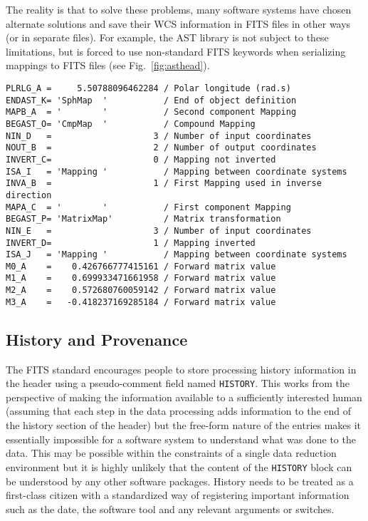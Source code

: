 \documentclass[final,authoryear,5p,times,twocolumn]{elsarticle}
\begin{document}
{{The reality is that to solve these problems, many software systems
have chosen alternate solutions and save their WCS information in FITS
files in other ways (or in separate files). For example, the AST
library \citep{1998ASPC..145...41W,2012ASPC..461..825B} is not subject
to these limitations, but
is forced to use non-standard FITS keywords when serializing mappings
to FITS files (see Fig.~\ref{fig:asthead}).


\begin{figure*}
\begin{minipage}{\textwidth}
\begin{lstlisting}
PLRLG_A =     5.50788096462284 / Polar longitude (rad.s)
ENDAST_K= 'SphMap  '           / End of object definition
MAPB_A  = '        '           / Second component Mapping
BEGAST_O= 'CmpMap  '           / Compound Mapping
NIN_D   =                    3 / Number of input coordinates
NOUT_B  =                    2 / Number of output coordinates
INVERT_C=                    0 / Mapping not inverted
ISA_I   = 'Mapping '           / Mapping between coordinate systems
INVA_B  =                    1 / First Mapping used in inverse direction
MAPA_C  = '        '           / First component Mapping
BEGAST_P= 'MatrixMap'          / Matrix transformation
NIN_E   =                    3 / Number of input coordinates
INVERT_D=                    1 / Mapping inverted
ISA_J   = 'Mapping '           / Mapping between coordinate systems
M0_A    =    0.426766777415161 / Forward matrix value
M1_A    =    0.699933471661958 / Forward matrix value
M2_A    =    0.572680760059142 / Forward matrix value
M3_A    =   -0.418237169285184 / Forward matrix value
\end{lstlisting}
\caption{Example header of a representation of an AST WCS object in a
  FITS header  when the mapping is too complex to be represented using the
  FITS-WCS standard.}
\label{fig:asthead}
\end{minipage}
\end{figure*}


\subsection{History and Provenance}
\label{sec:history}


The FITS standard encourages people to store processing history
information in the header using a pseudo-comment field named
\texttt{HISTORY}. This works from the perspective of making the information
available to a sufficiently interested human (assuming that each step in the
data processing adds information to the end of the history section of the
header) but the free-form nature of the entries makes it essentially
impossible for a software system to understand what was done to the data.
This may be possible within the constraints of a single data reduction
environment but it is highly unlikely that the content of the
\texttt{HISTORY} block can be understood by any other software packages. History
needs to be treated as a first-class citizen with a standardized way of
registering important information such as the date, the software tool and
any relevant arguments or switches. 


}}
\end{document}
